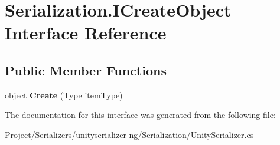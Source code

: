 \hypertarget{interface_serialization_1_1_i_create_object}{}\section{Serialization.\+I\+Create\+Object Interface Reference}
\label{interface_serialization_1_1_i_create_object}
\subsection*{Public Member Functions}
\begin{DoxyCompactItemize}
\item 
\mbox{\label{interface_serialization_1_1_i_create_object_a203d0586d4ab735f18519ff79d1ce4d6}} 
object {\bfseries Create} (Type item\+Type)
\end{DoxyCompactItemize}


The documentation for this interface was generated from the following file\+:\begin{DoxyCompactItemize}
\item 
Project/\+Serializers/unityserializer-\/ng/\+Serialization/Unity\+Serializer.\+cs\end{DoxyCompactItemize}
